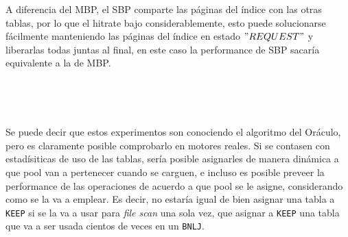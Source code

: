 A diferencia del MBP, el SBP comparte las páginas del índice con las otras tablas, por lo que el hitrate
bajo considerablemente, esto puede solucionarse fácilmente manteniendo las páginas del índice en estado
$"REQUEST"$ y liberarlas todas juntas al final, en este caso la performance de SBP sacaría equivalente a la de MBP.

~\newline

~\newline

Se puede decir que estos experimentos son conociendo el algoritmo del Or\'aculo,
pero es claramente posible comprobarlo en motores reales. Si se contasen
con estadísiticas de uso de las tablas, sería posible asignarles de manera
din\'amica a que pool van a pertenecer cuando se carguen, e incluso es
posible preveer la performance de las operaciones de acuerdo a que pool
se le asigne, considerando como se la va a emplear. Es decir, no estaría
igual de bien asignar una tabla a \texttt{KEEP} si se la va a usar para \textit{file scan}
una sola vez, que asignar a \texttt{KEEP} una tabla que va a ser usada cientos de veces
en un \texttt{BNLJ}.
